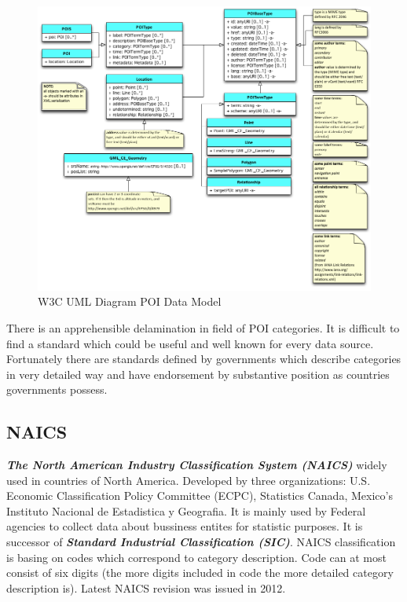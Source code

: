 \begin{figure}
	\centering
	\includegraphics[scale=0.5]{W3c_poi_model.png}
	\caption{W3C UML Diagram POI Data Model}
	\label{fig:@=w3cDataModel}
\end{figure}
There is an apprehensible delamination in field of POI categories. It is difficult to find a standard which could be useful and well known for every data source. Fortunately there are standards defined by governments which describe categories in very detailed way and have endorsement by substantive position as countries governments possess. 
\subsection{NAICS}
\textit{\textbf{The North American Industry Classification System (NAICS)}} widely used in countries of North America. Developed by three organizations:  U.S. Economic Classification Policy Committee (ECPC), Statistics Canada, Mexico's Instituto Nacional de Estadistica y Geografia. It is mainly used by Federal agencies to collect data about bussiness entites for statistic purposes. It is successor of \textit{\textbf{Standard Industrial Classification (SIC)}}. NAICS classification is basing on codes which correspond to category description. Code can at most consist of six digits (the more digits included in code the more detailed category description is). Latest NAICS revision was issued in 2012. \cite{15} \cite{16}
